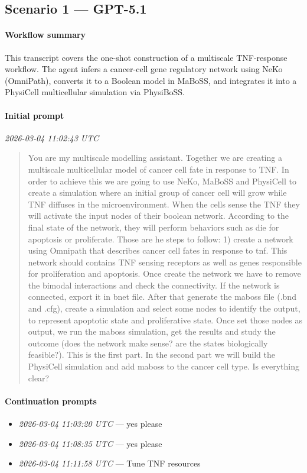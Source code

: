 \subsection{Scenario 1 — GPT-5.1}

\paragraph{Workflow summary}
This transcript covers the one-shot construction of a multiscale TNF-response workflow. The agent infers a cancer-cell gene regulatory network using NeKo (OmniPath), converts it to a Boolean model in MaBoSS, and integrates it into a PhysiCell multicellular simulation via PhysiBoSS.

\paragraph{Initial prompt} \hfill \textit{\small 2026-03-04 11:02:43 UTC}
\begin{quote}
You are my multiscale modelling assistant. Together we are creating a multiscale multicellular model of cancer cell fate in response to TNF. In order to achieve this we are going to use NeKo, MaBoSS and PhysiCell to create a simulation where an initial group of cancer cell will grow while TNF diffuses in the microenvironment. When the cells sense the TNF they will activate the input nodes of their boolean network. According to the final state of the network, they will perform behaviors such as die for apoptosis or proliferate. Those are he steps to follow: 1) create a network using Omnipath that describes cancer cell fates in response to tnf. This network should contains TNF sensing receptors as well as genes responsible for proliferation and apoptosis. Once create the network we have to remove the bimodal interactions and check the connectivity. If the network is connected, export it in bnet file. After that generate the maboss file (.bnd and .cfg), create a simulation and select some nodes to identify the output, to represent apoptotic state and proliferative state. Once set those nodes as output, we run the maboss simulation, get the results and study the outcome (does the network make
sense? are the states biologically feasible?). This is the first part. In the second part we will build the PhysiCell simulation and add maboss to the cancer cell type. Is everything clear?
\end{quote}

\paragraph{Continuation prompts}
\begin{itemize}
\item \textit{\small 2026-03-04 11:03:20 UTC} --- yes please
\item \textit{\small 2026-03-04 11:08:35 UTC} --- yes please
\item \textit{\small 2026-03-04 11:11:58 UTC} --- Tune TNF resources
\end{itemize}

